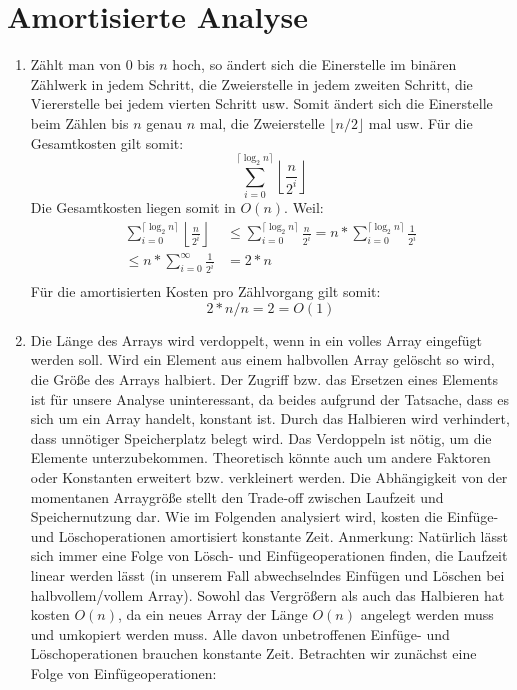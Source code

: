 \documentclass[a4paper,10pt]{article}
\begin{document}
\section{Amortisierte Analyse}
\begin{enumerate}
 \item
Zählt man von $0$ bis $n$ hoch, so ändert sich die Einerstelle im binären Zählwerk in jedem Schritt, die Zweierstelle in jedem zweiten Schritt, die Viererstelle bei jedem vierten Schritt usw.
Somit ändert sich die Einerstelle beim Zählen bis $n$ genau $n$ mal, die Zweierstelle $\lfloor{n/2}\rfloor$ mal usw.
Für die Gesamtkosten gilt somit:
\[ \sum_{i = 0}^{\lceil\log_2 n\rceil} \left\lfloor\frac{n}{2^i}\right\rfloor\]
Die Gesamtkosten liegen somit in $O(n)$. Weil:
\begin{align*}
 \sum_{i = 0}^{\lceil\log_2 n\rceil} \left\lfloor\frac{n}{2^i}\right\rfloor &\leq \sum_{i = 0}^{\lceil\log_2 n\rceil} \frac{n}{2^i} =  n * \sum_{i = 0}^{\lceil\log_2 n\rceil} \frac{1}{2^i} \\
 \leq  n * \sum_{i = 0}^{\infty} \frac{1}{2^i} &= 2 * n \\
\end{align*}
Für die amortisierten Kosten pro Zählvorgang gilt somit: 
\[ 2 * n / n = 2 = O(1) \]

\item
Die Länge des Arrays wird verdoppelt, wenn in ein volles Array eingefügt werden soll. Wird ein Element aus einem halbvollen Array gelöscht so wird, die Größe des Arrays halbiert.
Der Zugriff bzw. das Ersetzen eines Elements ist für unsere Analyse uninteressant, da beides aufgrund der Tatsache, dass es sich um ein Array handelt, konstant ist. Durch das Halbieren wird verhindert, dass unnötiger Speicherplatz belegt wird.
Das Verdoppeln ist nötig, um die Elemente unterzubekommen. Theoretisch könnte auch um andere Faktoren oder Konstanten erweitert bzw. verkleinert werden. Die Abhängigkeit von der momentanen Arraygröße stellt den Trade-off zwischen Laufzeit und Speichernutzung dar.
Wie im Folgenden analysiert wird, kosten die Einfüge- und Löschoperationen amortisiert konstante Zeit. Anmerkung: Natürlich lässt sich immer eine Folge von Lösch- und Einfügeoperationen finden, die Laufzeit linear werden lässt (in unserem Fall abwechselndes Einfügen
und Löschen bei halbvollem/vollem Array).
Sowohl das Vergrößern als auch das Halbieren hat kosten $O(n)$, da ein neues Array der Länge $O(n)$ angelegt werden muss und umkopiert werden muss. Alle davon unbetroffenen Einfüge- und Löschoperationen brauchen konstante Zeit.
Betrachten wir zunächst eine Folge von Einfügeoperationen: 


\end{enumerate}
\end{document}
